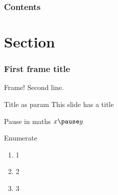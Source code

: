 \documentclass{beamer}
\begin{document}
\begin{frame}
    \frametitle{Contents}
    \tableofcontents
\end{frame}

\section{Section}

\begin{frame}
    \frametitle{First frame title}
    Frame!
    \pause
    Second line.
\end{frame}

\begin{frame}{Title as param}
    This slide has a title
\end{frame}

\begin{frame}{Pause in maths}
    $x \pause y$
\end{frame}

\begin{frame}{Enumerate}
    \begin{enumerate}
        \item 1
        \item 2
        \item 3
    \end{enumerate}
\end{frame}
\end{document}
